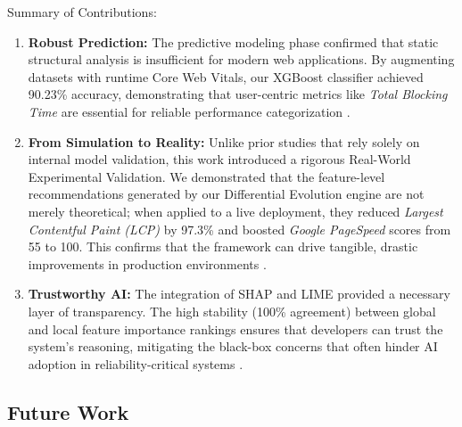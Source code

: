 \documentclass[sn-nature]{sn-jnl}
\begin{document}
Summary of Contributions:
\begin{enumerate}
    \item \textbf{Robust Prediction:} The predictive modeling phase confirmed that static structural analysis is insufficient for modern web applications. By augmenting datasets with runtime Core Web Vitals, our XGBoost classifier achieved 90.23\% accuracy, demonstrating that user-centric metrics like \textit{Total Blocking Time} are essential for reliable performance categorization \cite{ghattas2025, mathur2024}.
    
    \item \textbf{From Simulation to Reality:} Unlike prior studies that rely solely on internal model validation, this work introduced a rigorous Real-World Experimental Validation. We demonstrated that the feature-level recommendations generated by our Differential Evolution engine are not merely theoretical; when applied to a live deployment, they reduced \textit{Largest Contentful Paint (LCP)} by 97.3\% and boosted \textit{Google PageSpeed} scores from 55 to 100. This confirms that the framework can drive tangible, drastic improvements in production environments \cite{notz2024}.
    
    \item \textbf{Trustworthy AI:} The integration of SHAP and LIME provided a necessary layer of transparency. The high stability (100\% agreement) between global and local feature importance rankings ensures that developers can trust the system's reasoning, mitigating the black-box concerns that often hinder AI adoption in reliability-critical systems \cite{salih2024, hassija2024}.
\end{enumerate}

\subsection{Future Work}
\end{document}
